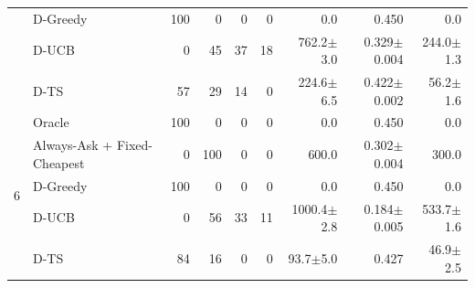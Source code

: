 \begin{tabular}{llrrrrrrr}
 & D-Greedy & 100 & 0 & 0 & 0 & 0.0 & 0.450 & 0.0 \\
 & D-UCB & 0 & 45 & 37 & 18 & 762.2{\scriptsize$\pm$3.0} & 0.329{\scriptsize$\pm$0.004} & 244.0{\scriptsize$\pm$1.3} \\
 & D-TS & 57 & 29 & 14 & 0 & 224.6{\scriptsize$\pm$6.5} & 0.422{\scriptsize$\pm$0.002} & 56.2{\scriptsize$\pm$1.6} \\
\midrule
\multirow{5}{*}{6} & Oracle & 100 & 0 & 0 & 0 & 0.0 & 0.450 & 0.0 \\
 & Always-Ask + Fixed-Cheapest & 0 & 100 & 0 & 0 & 600.0 & 0.302{\scriptsize$\pm$0.004} & 300.0 \\
 & D-Greedy & 100 & 0 & 0 & 0 & 0.0 & 0.450 & 0.0 \\
 & D-UCB & 0 & 56 & 33 & 11 & 1000.4{\scriptsize$\pm$2.8} & 0.184{\scriptsize$\pm$0.005} & 533.7{\scriptsize$\pm$1.6} \\
 & D-TS & 84 & 16 & 0 & 0 & 93.7{\scriptsize$\pm$5.0} & 0.427 & 46.9{\scriptsize$\pm$2.5} \\
\bottomrule
\end{tabular}
